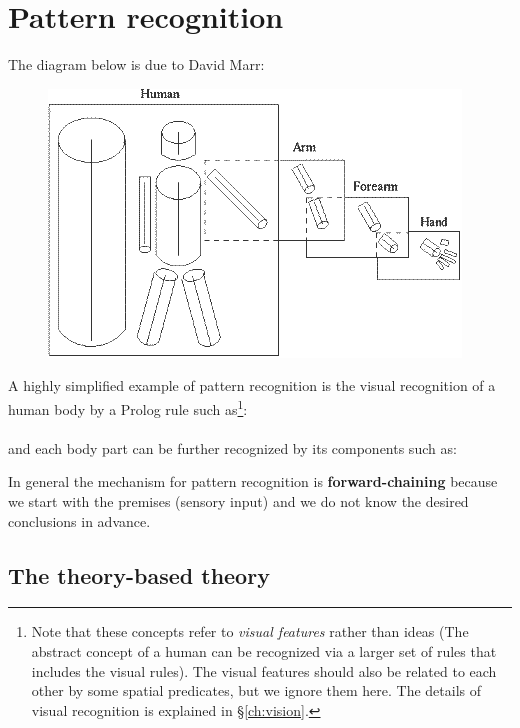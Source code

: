 \chapter{Pattern recognition}
\label{ch:pattern-recognition}
\minitoc

The diagram below is due to David Marr:
\begin{figure}[H]
\centering
\includegraphics[scale=0.7, bb=0 0 414 269]{Marr3DModel.PNG}
\end{figure}

A highly simplified example of pattern recognition is the visual recognition of a human body by a Prolog rule such as\footnote{
Note that these concepts refer to \textit{visual features} rather than ideas  (The abstract concept of a human can be recognized via a larger set of rules that includes the visual rules).  The visual features should also be related to each other by some spatial predicates, but we ignore them here.  The details of visual recognition is explained in \S\ref{ch:vision}.
}:\\
\hspace*{1cm} \\
and each body part can be further recognized by its components such as:\\
\hspace*{1cm} 

In general the mechanism for pattern recognition is \textbf{forward-chaining} because we start with the premises (sensory input) and we do not know the desired conclusions in advance.

\section{The theory-based theory}

